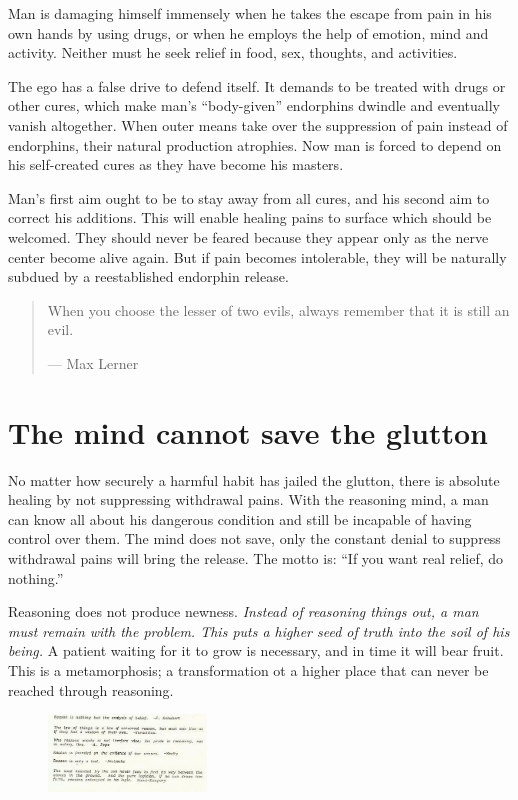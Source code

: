 \documentclass[landscape,twocolumn,letterpaper]{article}
\begin{document}
Man is damaging himself immensely when he takes the escape from pain
in his own hands by using drugs, or when he employs the help of
emotion, mind and activity. Neither must he seek relief in food, sex,
thoughts, and activities.

The ego has a false drive to defend itself. It demands to be treated
with drugs or other cures, which make man's ``body-given'' endorphins
dwindle and eventually vanish altogether. When outer means take over
the suppression of pain instead of endorphins, their natural
production atrophies. Now man is forced to depend on his self-created
cures as they have become his masters.

Man's first aim ought to be to stay away from all cures, and his
second aim to correct his additions. This will enable healing pains to
surface which should be welcomed. They should never be feared because
they appear only as the nerve center become alive again. But if pain
becomes intolerable, they will be naturally subdued by a reestablished
endorphin release.

\begin{quote} When you choose the lesser of two evils, always remember
that it is still an evil.

--- Max Lerner
\end{quote}

\section{The mind cannot save the glutton}
\label{sec:tmcstg}

No matter how securely a harmful habit has jailed the glutton, there is
absolute healing by not suppressing withdrawal pains. With the
reasoning mind, a man can know all about his dangerous condition and
still be incapable of having control over them. The mind does not
save, only the constant denial to suppress withdrawal pains will bring
the release. The motto is: ``If you want real relief, do nothing.''

Reasoning does not produce newness. \emph{Instead of reasoning things
out, a man must remain with the problem. This puts a higher seed of
truth into the soil of his being.} A patient waiting for it to grow is
necessary, and in time it will bear fruit. This is a metamorphosis; a
transformation ot a higher place that can never be reached through
reasoning.

\begin{figure} \centering
  \includegraphics[width=0.375\textwidth,bb=0 0 414 203]{p23quotes.jpg}
\end{figure}
\end{document}

